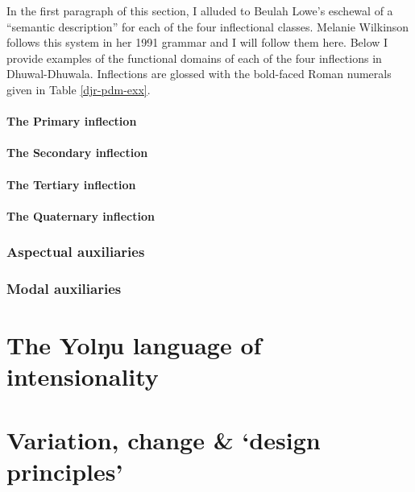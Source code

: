 \documentclass[11pt]{report}
\begin{document}
In the first paragraph of this section, I alluded to Beulah Lowe's eschewal of a ``semantic description'' for each of the four inflectional classes. Melanie Wilkinson follows this system in her 1991 grammar and I will follow them here. Below I provide examples of the functional domains of each of the four inflections in Dhuwal-Dhuwala. Inflections are glossed with the bold-faced Roman numerals given in Table \ref{djr-pdm-exx}.

\subsubsection{The Primary inflection}

\subsubsection{The Secondary inflection}

\subsubsection{The Tertiary inflection}

\subsubsection{The Quaternary inflection}


\subsection{Aspectual auxiliaries}

\subsection{Modal auxiliaries}


\chapter{The Yolŋu language of intensionality}\label{anY}
\chapter{Variation, change \& `design principles'}\label{diaY}

\vfill
\end{document}
